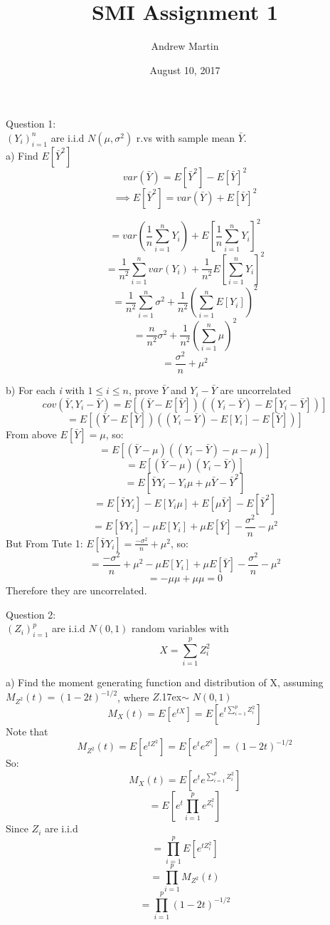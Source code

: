 \documentclass[a4paper]{article}
\begin{document}
	\title{SMI Assignment 1}
	\date{August 10, 2017}
	\author{Andrew Martin}
	\maketitle
	
	Question 1:\\
	$(Y_i)_{i=1}^n$ are i.i.d $N(\mu,\sigma^2)$ r.vs with sample mean $\bar{Y}$.\\
	
	a) Find $E\left[\bar{Y}^2\right]$\\
	$$var(\bar{Y})=E\left[\bar{Y}^2\right]-E\left[\bar{Y}\right]^2$$
	$$\implies E\left[\bar{Y}^2\right]=var(\bar{Y})+E\left[\bar{Y}\right]^2$$
	
	$$=var(\frac{1}{n}\sum_{i=1}^{n}Y_i)+E\left[\frac{1}{n}\sum_{i=1}^{n}Y_i\right]^2$$
	$$=\frac{1}{n^2}\sum_{i=1}^{n}var(Y_i)+\frac{1}{n^2}E\left[\sum_{i=1}^{n}Y_i\right]^2$$
	$$=\frac{1}{n^2}\sum_{i=1}^{n}\sigma^2+\frac{1}{n^2}(\sum_{i=1}^{n}E\left[Y_i\right])^2$$
	$$=\frac{n}{n^2}\sigma^2+\frac{1}{n^2}(\sum_{i=1}^{n}\mu)^2$$
	$$=\frac{\sigma^2}{n}+\mu^2$$

	
	
	
	
	b) For each \textit{i} with $1\leq i\leq n$, prove $\bar{Y}$ and $Y_i - \bar{Y}$ are uncorrelated\\
	$$cov(\bar{Y},Y_i-\bar{Y})=E\left[(\bar{Y}-E[\bar{Y}])((Y_i-\bar{Y})-E[Y_i-\bar{Y}])\right]$$
	$$=E\left[(\bar{Y}-E[\bar{Y}])((Y_i-\bar{Y})-E[Y_i]-E[\bar{Y}])\right]$$
	From above $E[\bar{Y}] =\mu$, so:
	$$=E\left[(\bar{Y}-\mu)((Y_i-\bar{Y})-\mu-\mu)\right]$$
	$$=E\left[(\bar{Y}-\mu)(Y_i-\bar{Y})\right]$$
	$$=E[\bar{Y}Y_i-Y_i\mu +\mu \bar{Y}-\bar{Y}^2]$$
	$$=E[\bar{Y}Y_i]-E[Y_i\mu] +E[\mu \bar{Y}]-E[\bar{Y}^2]$$
	$$=E[\bar{Y}Y_i]-\mu E[Y_i] +\mu E[\bar{Y}]-\frac{\sigma^2}{n}-\mu^2$$
	But From Tute 1: $E[\bar{Y}Y_i]=\frac{-\sigma^2}{n}+\mu^2$, so:
	$$=\frac{-\sigma^2}{n}+\mu^2-\mu E[Y_i] +\mu E[\bar{Y}]-\frac{\sigma^2}{n}-\mu^2$$
	$$=-\mu \mu +\mu \mu=0$$
	Therefore they are uncorrelated.
	
	\newpage
	Question 2:\\
	$(Z_i)_{i=1}^p$ are i.i.d $N(0,1)$ random variables with
	$$X=\sum_{i=1}^{p}Z_i^2$$
	
	a) Find the moment generating function and distribution of X, assuming $M_{Z^2}(t)=(1-2t)^{-1/2}$, where $Z${\raise.17ex\hbox{$\scriptstyle\mathtt{\sim}$}} $N(0,1)$
	$$M_X(t)=E\left[e^{tX}\right]=E\left[e^{t\sum_{i=1}^{p}Z_i^2}\right]$$
	Note that
	$$M_{Z^2}(t)=E[e^{tZ^2}]=E[e^te^{Z^2}]=(1-2t)^{-1/2}$$
	So:
	$$M_X(t)=E\left[e^te^{\sum_{i=1}^{p}Z_i^2}\right]$$
	$$=E\left[e^t\prod_{i=1}^{p}e^{Z_i^2}\right]$$
	Since $Z_i$ are i.i.d
	$$=\prod_{i=1}^{p}E\left[e^{tZ_i^2}\right]$$
	$$=\prod_{i=1}^{p}M_{Z^2}(t)$$
	$$=\prod_{i=1}^{p}(1-2t)^{-1/2}$$
	
\end{document}
